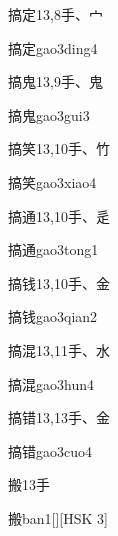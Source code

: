 \begin{entry}{搞定}{13,8}{⼿、⼧}
  \begin{phonetics}{搞定}{gao3ding4}
  \end{phonetics}
\end{entry}

\begin{entry}{搞鬼}{13,9}{⼿、⿁}
  \begin{phonetics}{搞鬼}{gao3gui3}
  \end{phonetics}
\end{entry}

\begin{entry}{搞笑}{13,10}{⼿、⽵}
  \begin{phonetics}{搞笑}{gao3xiao4}
  \end{phonetics}
\end{entry}

\begin{entry}{搞通}{13,10}{⼿、⾡}
  \begin{phonetics}{搞通}{gao3tong1}
  \end{phonetics}
\end{entry}

\begin{entry}{搞钱}{13,10}{⼿、⾦}
  \begin{phonetics}{搞钱}{gao3qian2}
  \end{phonetics}
\end{entry}

\begin{entry}{搞混}{13,11}{⼿、⽔}
  \begin{phonetics}{搞混}{gao3hun4}
  \end{phonetics}
\end{entry}

\begin{entry}{搞错}{13,13}{⼿、⾦}
  \begin{phonetics}{搞错}{gao3cuo4}
  \end{phonetics}
\end{entry}

\begin{entry}{搬}{13}{⼿}
  \begin{phonetics}{搬}{ban1}[][HSK 3]
  \end{phonetics}
\end{entry}

